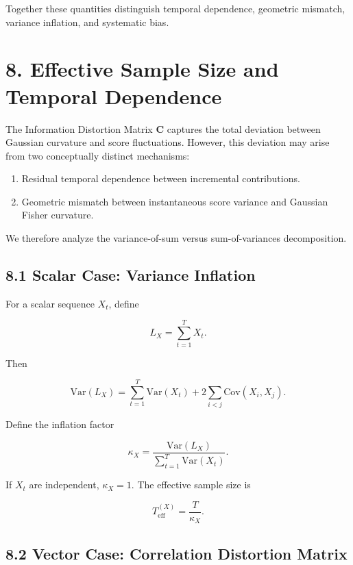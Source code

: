 \documentclass[11pt]{article}
\begin{document}
Together these quantities distinguish temporal dependence,
geometric mismatch, variance inflation, and systematic bias.

\section*{8. Effective Sample Size and Temporal Dependence}

The Information Distortion Matrix $\mathbf C$ captures the total deviation between
Gaussian curvature and score fluctuations. However, this deviation may arise from two conceptually distinct mechanisms:

\begin{enumerate}
\item Residual temporal dependence between incremental contributions.
\item Geometric mismatch between instantaneous score variance and Gaussian Fisher curvature.
\end{enumerate}

We therefore analyze the variance-of-sum versus sum-of-variances decomposition.

\subsection*{8.1 Scalar Case: Variance Inflation}

For a scalar sequence $X_t$, define

\begin{equation}
L_X = \sum_{t=1}^T X_t.
\end{equation}

Then

\begin{equation}
\mathrm{Var}(L_X)
=
\sum_{t=1}^T \mathrm{Var}(X_t)
+
2\sum_{i<j}\mathrm{Cov}(X_i,X_j).
\end{equation}

Define the inflation factor

\begin{equation}
\kappa_X
=
\frac{\mathrm{Var}(L_X)}
{\sum_{t=1}^T \mathrm{Var}(X_t)}.
\end{equation}

If $X_t$ are independent, $\kappa_X=1$.
The effective sample size is

\begin{equation}
T_{\mathrm{eff}}^{(X)} = \frac{T}{\kappa_X}.
\end{equation}

\subsection*{8.2 Vector Case: Correlation Distortion Matrix}
\end{document}
